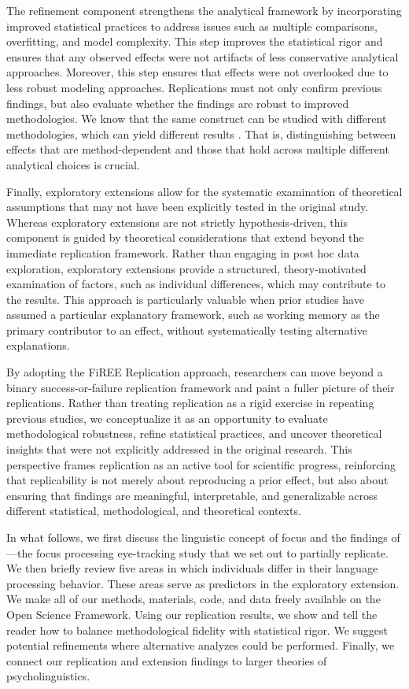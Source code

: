 The refinement component strengthens the analytical framework by incorporating improved statistical practices to address issues such as multiple comparisons, overfitting, and model complexity. This step improves the statistical rigor and ensures that any observed effects were not artifacts of less conservative analytical approaches. Moreover, this step ensures that effects were not overlooked due to less robust modeling approaches. Replications must not only confirm previous findings, but also evaluate whether the findings are robust to improved methodologies. We know that the same construct can be studied with different methodologies, which can yield different results \citep[e.g.,][] {roettger2017methodological}. That is, distinguishing between effects that are method-dependent and those that hold across multiple different analytical choices is crucial.

Finally, exploratory extensions allow for the systematic examination of theoretical assumptions that may not have been explicitly tested in the original study. Whereas exploratory extensions are not strictly hypothesis-driven, this component is guided by theoretical considerations that extend beyond the immediate replication framework. Rather than engaging in post hoc data exploration, exploratory extensions provide a structured, theory-motivated examination of factors, such as individual differences, which may contribute to the results. This approach is particularly valuable when prior studies have assumed a particular explanatory framework, such as working memory as the primary contributor to an effect, without systematically testing alternative explanations.

By adopting the FiREE Replication approach, researchers can move beyond a binary success-or-failure replication framework \citep{Nosek_Errington2020} and paint a fuller picture of their replications. Rather than treating replication as a rigid exercise in repeating previous studies, we conceptualize it as an opportunity to evaluate methodological robustness, refine statistical practices, and uncover theoretical insights that were not explicitly addressed in the original research. This perspective frames replication as an active tool for scientific progress, reinforcing that replicability is not merely about reproducing a prior effect, but also about ensuring that findings are meaningful, interpretable, and generalizable across different statistical, methodological, and theoretical contexts.

In what follows, we first discuss the linguistic concept of focus and the findings of \cite{Ge2021}---the focus processing eye-tracking study that we set out to partially replicate. We then briefly review five areas in which individuals differ in their language processing behavior. These areas serve as predictors in the exploratory extension. We make all of our methods, materials, code, and data freely available on the Open Science Framework. Using our \cite{Ge2021} replication results, we show and tell the reader how to balance methodological fidelity with statistical rigor. We suggest potential refinements where alternative analyzes could be performed. Finally, we connect our replication and extension findings to larger theories of psycholinguistics. 

